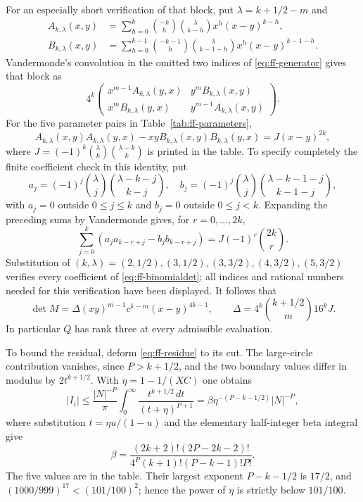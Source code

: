 \documentclass[12pt]{article}
\numberwithin{equation}{section}
\begin{document}
For an especially short verification of that block, put
$\lambda=k+1/2-m$ and
\begin{align*}
 A_{k,\lambda}(x,y)&=\sum_{h=0}^k
   \binom{-k}{h}\binom{\lambda}{k-h}x^h(x-y)^{k-h},\\
 B_{k,\lambda}(x,y)&=\sum_{h=0}^{k-1}
   \binom{-k-1}{h}\binom{\lambda}{k-1-h}x^h(x-y)^{k-1-h}.
\end{align*}
Vandermonde's convolution in the omitted two indices of
\eqref{eq:ff-generator} gives that block as
\[
 4^k\begin{pmatrix}
 x^{m-1}A_{k,\lambda}(y,x)&y^mB_{k,\lambda}(x,y)\\
 x^mB_{k,\lambda}(y,x)&y^{m-1}A_{k,\lambda}(x,y)
 \end{pmatrix}.
\]
For the five parameter pairs in Table~\ref{tab:ff-parameters},
\begin{equation}\label{eq:ff-binomialdet}
 A_{k,\lambda}(x,y)A_{k,\lambda}(y,x)
 -xyB_{k,\lambda}(x,y)B_{k,\lambda}(y,x)
 =J(x-y)^{2k},
\end{equation}
where $J=(-1)^k\binom\lambda k\binom{\lambda-k}k$ is printed in the
table. To specify completely the finite coefficient check in this
identity, put
\[
 a_j=(-1)^j\binom\lambda j\binom{\lambda-k-j}{k-j},\quad
 b_j=(-1)^j\binom\lambda j\binom{\lambda-k-1-j}{k-1-j},
\]
with $a_j=0$ outside $0\le j\le k$ and $b_j=0$ outside
$0\le j<k$. Expanding the preceding sums by Vandermonde gives,
for $r=0,\ldots,2k$,
\[
 \sum_{j=0}^k(a_ja_{k-r+j}-b_jb_{k-r+j})
 =J(-1)^r\binom{2k}{r}.
\]
Substitution of $(k,\lambda)=(2,1/2),(3,1/2),(3,3/2),
(4,3/2),(5,3/2)$ verifies every coefficient of
\eqref{eq:ff-binomialdet}; all indices and rational numbers needed
for this verification have been displayed. It follows that
\begin{equation}\label{eq:ff-two-det}
 \det M=\Delta(xy)^{m-1}c^{k-m}(x-y)^{4k-1},\qquad
 \Delta=4^k\binom{k+1/2}{m}16^kJ.
\end{equation}
In particular $Q$ has rank three at every admissible evaluation.

To bound the residual, deform \eqref{eq:ff-residue} to its cut.
The large-circle contribution vanishes, since $P>k+1/2$, and the
two boundary values differ in modulus by $2t^{k+1/2}$.
With $\eta=1-1/(XC)$ one obtains
\[
 |I_i|\le \frac{|N|^{-P}}\pi
       \int_0^\infty\frac{t^{k+1/2}\,dt}{(t+\eta)^{P+1}}
 =\beta\eta^{-(P-k-1/2)}|N|^{-P},
\]
where substitution $t=\eta u/(1-u)$ and the elementary half-integer
beta integral give
\begin{equation}\label{eq:ff-beta}
 \beta=\frac{(2k+2)!(2P-2k-2)!}
 {4^P(k+1)!(P-k-1)!P!}.
\end{equation}
The five values are in the table. Their largest exponent
$P-k-1/2$ is $17/2$, and
$(1000/999)^{17}<(101/100)^2$; hence the power of $\eta$ is
strictly below $101/100$.
\end{document}
